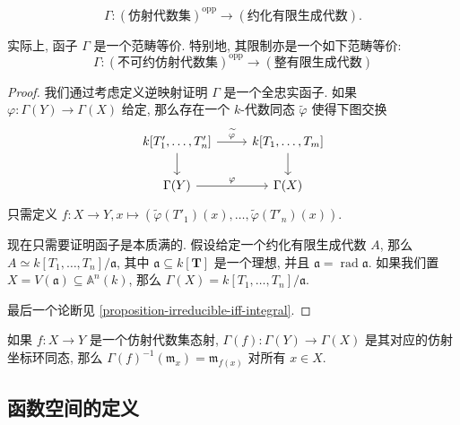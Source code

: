 \[
  \Gamma: (\text{仿射代数集})^{\operatorname{opp}} \to
  (\text{约化有限生成代数}).
\]

\begin{proposition}
  \label{proposition-category-equivalence-irreducible-affine-and-finite-generated-algebra}
  实际上, 函子 \( \Gamma \) 是一个范畴等价. 特别地, 其限制亦是一个如下范畴等价:
  \[
    \Gamma: (\text{不可约仿射代数集})^{\operatorname{opp}} \to
    (\text{整有限生成代数})
  \]
\end{proposition}
\begin{proof}
  我们通过考虑定义逆映射证明 \( \Gamma \) 是一个全忠实函子.
  如果 \( \varphi: \Gamma(Y) \to \Gamma(X) \) 给定, 那么存在一个 \( k
  \)-代数同态 \( \widetilde{\varphi} \) 使得下图交换
  \[\begin{tikzcd}
    {k[T_1', \ldots, T'_n]} & {k[T_1,\ldots,T_m]} \\
    {\Gamma(Y)} & {\Gamma(X)}
    \arrow["{\widetilde{\varphi}}", from=1-1, to=1-2]
    \arrow[from=1-1, to=2-1]
    \arrow[from=1-2, to=2-2]
    \arrow["\varphi", from=2-1, to=2-2]
  \end{tikzcd}\]
  只需定义 \( f: X \to Y, x \mapsto (\widetilde{\varphi}(T'_1)(x),\ldots,
  \widetilde{\varphi}(T'_n)(x)) \).

  现在只需要证明函子是本质满的. 假设给定一个约化有限生成代数 \( A \), 那么 \( A
  \simeq k[T_1,\ldots, T_n]/ \mathfrak{a} \), 其中 \( \mathfrak{a} \subseteq
  k[\mathbf{T}] \) 是一个理想, 并且 \( \mathfrak{a} = \operatorname{rad}
  \mathfrak{a} \). 如果我们置 \( X = V(\mathfrak{a}) \subseteq \mathbb{A}^n(k)
  \), 那么 \( \Gamma(X) = k[T_1,\ldots, T_n] / \mathfrak{a} \).

  最后一个论断见 \cref{proposition-irreducible-iff-integral}.
\end{proof}

\begin{proposition}
  如果 \( f: X \to Y \) 是一个仿射代数集态射, \( \Gamma(f): \Gamma(Y) \to
  \Gamma(X) \) 是其对应的仿射坐标环同态, 那么 \( \Gamma(f)^{-1}(\mathfrak{m}_x)
  = \mathfrak{m}_{f(x)} \) 对所有 \( x \in X \).
\end{proposition}

\subsection{函数空间的定义}

